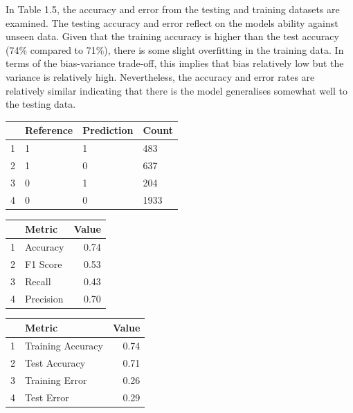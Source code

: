 \documentclass[11pt,preprint, authoryear]{elsarticle}
\let\origtable\table
\let\endorigtable\endtable
\renewenvironment{table}[1][2] {
    \expandafter\origtable\expandafter[H]
} {
    \endorigtable
}
\numberwithin{equation}{section}
\numberwithin{figure}{section}
\numberwithin{table}{section}
\begin{document}
In Table 1.5, the accuracy and error from the testing and training
datasets are examined. The testing accuracy and error reflect on the
models ability against unseen data. Given that the training accuracy is
higher than the test accuracy (74\% compared to 71\%), there is some
slight overfitting in the training data. In terms of the bias-variance
trade-off, this implies that bias relatively low but the variance is
relatively high. Nevertheless, the accuracy and error rates are
relatively similar indicating that there is the model generalises
somewhat well to the testing data.

\begin{table}[H]
\centering
\begin{tabular}{rlll}
  \hline
 & Reference & Prediction & Count \\ 
  \hline
1 & 1 & 1 &  483 \\ 
  2 & 1 & 0 &  637 \\ 
  3 & 0 & 1 &  204 \\ 
  4 & 0 & 0 & 1933 \\ 
   \hline
\end{tabular}
\caption{Confusion Matrix for Logistic Model \label{tab1}} 
\end{table}

\begin{table}[H]
\centering
\begin{tabular}{rlr}
  \hline
 & Metric & Value \\ 
  \hline
1 & Accuracy & 0.74 \\ 
  2 & F1 Score & 0.53 \\ 
  3 & Recall & 0.43 \\ 
  4 & Precision & 0.70 \\ 
   \hline
\end{tabular}
\caption{Metrics for Logistic Regression \label{tab1}} 
\end{table}

\begin{table}[H]
\centering
\begin{tabular}{rlr}
  \hline
 & Metric & Value \\ 
  \hline
1 & Training Accuracy & 0.74 \\ 
  2 & Test Accuracy & 0.71 \\ 
  3 & Training Error & 0.26 \\ 
  4 & Test Error & 0.29 \\ 
   \hline
\end{tabular}
\caption{More Metrics for Logistic Regression \label{tab1}} 
\end{table}
\end{document}
